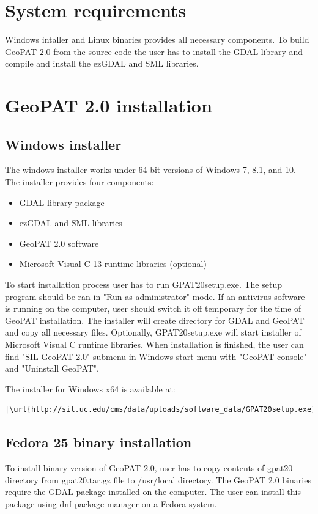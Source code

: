 \documentclass[12pt,margin=0.5in]{article}
\begin{document}
\begin{appendices}

\section{System requirements}
Windows intaller and Linux binaries provides all necessary components. 
To build GeoPAT 2.0 from the source code the user has to install the GDAL library and compile and install the ezGDAL and SML libraries.

\section{GeoPAT 2.0 installation}

\subsection{Windows installer}
The windows installer works under 64 bit versions of Windows 7, 8.1, and 10.
The installer provides four components:
\begin{itemize}
  \item{GDAL library package}
  \item{ezGDAL and SML libraries}
  \item{GeoPAT 2.0 software}
  \item{Microsoft Visual C 13 runtime libraries (optional)}
\end{itemize}
To start installation process user has to run GPAT20setup.exe.
The setup program should be ran in "Run as administrator" mode.
If an antivirus software is running on the computer, user should 
switch it off temporary for the time of GeoPAT installation.
The installer will create directory for GDAL and GeoPAT and 
copy all necessary files. Optionally, GPAT20setup.exe will
start installer of Microsoft Visual C runtime libraries.
When installation is finished, the user can find "SIL GeoPAT 2.0"
submenu in Windows start menu with "GeoPAT console" and "Uninstall GeoPAT".

The installer for Windows x64 is available at:

\begin{lstlisting}[escapechar=|]
|\url{http://sil.uc.edu/cms/data/uploads/software_data/GPAT20setup.exe}|
\end{lstlisting}

\subsection{Fedora 25 binary installation}
To install binary version of GeoPAT 2.0, user has to copy contents
of gpat20 directory from gpat20.tar.gz file to /usr/local directory.
The GeoPAT 2.0 binaries require the GDAL package installed on the computer.
The user can install this package using dnf package manager on a Fedora system.


\end{appendices}
\end{document}
